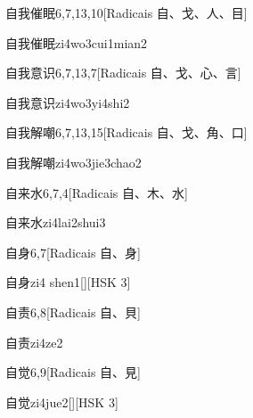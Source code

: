 \begin{entry}{自我催眠}{6,7,13,10}[Radicais ⾃、⼽、⼈、⽬]
  \begin{phonetics}{自我催眠}{zi4wo3cui1mian2}
  \end{phonetics}
\end{entry}

\begin{entry}{自我意识}{6,7,13,7}[Radicais ⾃、⼽、⼼、⾔]
  \begin{phonetics}{自我意识}{zi4wo3yi4shi2}
  \end{phonetics}
\end{entry}

\begin{entry}{自我解嘲}{6,7,13,15}[Radicais ⾃、⼽、⾓、⼝]
  \begin{phonetics}{自我解嘲}{zi4wo3jie3chao2}
  \end{phonetics}
\end{entry}

\begin{entry}{自来水}{6,7,4}[Radicais ⾃、⽊、⽔]
  \begin{phonetics}{自来水}{zi4lai2shui3}
  \end{phonetics}
\end{entry}

\begin{entry}{自身}{6,7}[Radicais ⾃、⾝]
  \begin{phonetics}{自身}{zi4 shen1}[][HSK 3]
  \end{phonetics}
\end{entry}

\begin{entry}{自责}{6,8}[Radicais ⾃、⾙]
  \begin{phonetics}{自责}{zi4ze2}
  \end{phonetics}
\end{entry}

\begin{entry}{自觉}{6,9}[Radicais ⾃、⾒]
  \begin{phonetics}{自觉}{zi4jue2}[][HSK 3]
  \end{phonetics}
\end{entry}

